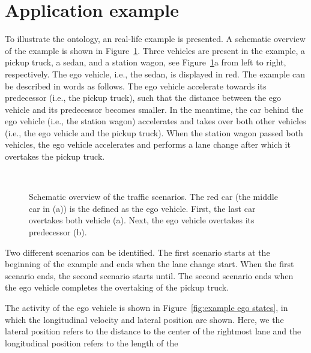 \section{Application example}
\label{sec:example}

To illustrate the ontology, an real-life example is presented. A schematic overview of the example is shown in Figure~\ref{fig:example schematic}. Three vehicles are present in the example, a pickup truck, a sedan, and a station wagon, see Figure~\ref{fig:example schematic}a from left to right, respectively. The ego vehicle, i.e., the sedan, is displayed in red. The example can be described in words as follows. The ego vehicle accelerate towards its predecessor (i.e., the pickup truck), such that the distance between the ego vehicle and its predecessor becomes smaller. In the meantime, the car behind the ego vehicle (i.e., the station wagon) accelerates and takes over both other vehicles (i.e., the ego vehicle and the pickup truck). When the station wagon passed both vehicles, the ego vehicle accelerates and performs a lane change after which it overtakes the pickup truck.

\begin{figure}
	\centering
	\setlength\figureheight{100pt}
	\setlength\figurewidth{260pt}
	\\
	\caption{Schematic overview of the traffic scenarios. The red car (the middle car in (a)) is the defined as the ego vehicle. First, the last car overtakes both vehicle (a). Next, the ego vehicle overtakes its predecessor (b).}
	\label{fig:example schematic}
\end{figure}

Two different scenarios can be identified. The first scenario starts at the beginning of the example and ends when the lane change start. When the first scenario ends, the second scenario starts until. The second scenario ends when the ego vehicle completes the overtaking of the pickup truck.

The activity of the ego vehicle is shown in Figure~\ref{fig:example ego states}, in which the longitudinal velocity and lateral position are shown. Here, we the lateral position refers to the distance to the center of the rightmost lane and the longitudinal position refers to the length of the 

